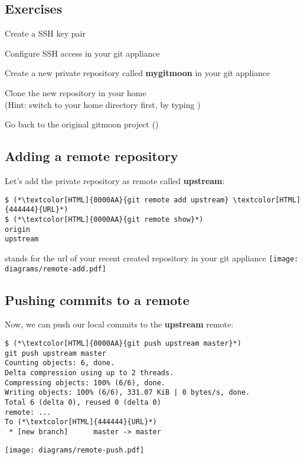 \subsection{Exercises}
\begin{frame}[fragile]
  \subslidetitle
  \begin{exercise}
    \item Create a SSH key pair
    \item Configure SSH access in your git appliance
    \item Create a new private repository called \textbf{mygitmoon} in your git appliance
    \item Clone the new repository in your home \\
      (Hint: switch to your home directory first, by typing )
    \item Go back to the original gitmoon project ()
  \end{exercise}
\end{frame}

\subsection{Adding a remote repository}
\begin{frame}[fragile]
  \subslidetitle
  Let's add the private repository as remote called \textbf{upstream}:
  \begin{lstlisting}
$ (*\textcolor[HTML]{0000AA}{git remote add upstream} \textcolor[HTML]{444444}{URL}*)
$ (*\textcolor[HTML]{0000AA}{git remote show}*)
origin
upstream
\end{lstlisting}
\vspace{1em}
 stands for the url of your recent created repository in your git appliance
\vspace{1em}
\center \texttt{[image: diagrams/remote-add.pdf]}
\end{frame}

\subsection{Pushing commits to a remote}
\begin{frame}[fragile]
  \subslidetitle
  Now, we can push our local commits to the \textbf{upstream} remote:
  \begin{lstlisting}
$ (*\textcolor[HTML]{0000AA}{git push upstream master}*)
git push upstream master
Counting objects: 6, done.
Delta compression using up to 2 threads.
Compressing objects: 100% (6/6), done.
Writing objects: 100% (6/6), 331.07 KiB | 0 bytes/s, done.
Total 6 (delta 0), reused 0 (delta 0)
remote: ...
To (*\textcolor[HTML]{444444}{URL}*)
 * [new branch]      master -> master
\end{lstlisting}
\vspace{-1.1em}
\center \texttt{[image: diagrams/remote-push.pdf]}
\end{frame}

